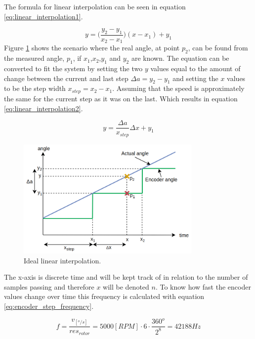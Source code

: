 The formula for linear interpolation \cite{lin_interpol} can be seen in equation \ref{eq:linear_interpolation1}. 

\begin{equation}
    y = \Big( \frac{y_2-y_1}{x_2-x_1} \Big)(x-x_1)+y_1
    \label{eq:linear_interpolation1}
\end{equation}
Figure \ref{fig:angle_interpolation1} shows the scenario where the real angle, at point $p_2$, can be found from the measured angle, $p_1$, if $x_1$,$x_2$,$y_1$ and $y_2$ are known.
The equation can be converted to fit the system by setting the two $y$ values equal to the amount of change between the current and last step $\Delta a = y_2 - y_1$ and setting the $x$ values to be the step width $x_{step} = x_2 - x_1$. Assuming that the speed is approximately the same for the current step as it was on the last. Which results in equation \ref{eq:linear_interpolation2}.

\begin{equation}
    y =  \frac{\Delta a}{x_{step}} \Delta x+y_1
    \label{eq:linear_interpolation2}
\end{equation}

\begin{figure}[H]
	\centering
	\includegraphics[width=0.8\textwidth]{pictures/software/angle_interpolation1.png}
	\caption{Ideal linear interpolation.}
	\label{fig:angle_interpolation1}
\end{figure}

The x-axis is discrete time and will be kept track of in relation to the number of samples passing and therefore $x$ will be denoted $n$. To know how fast the encoder values change over time this frequency is calculated with equation \ref{eq:encoder_step_frequency}.

\begin{equation}
    f = \frac{v_{[^o/s]}}{res_{rotor}} = 5000 [RPM] \cdot 6 \cdot \frac{360^o}{2^8} = 42188Hz
    \label{eq:encoder_step_frequency}
\end{equation}

